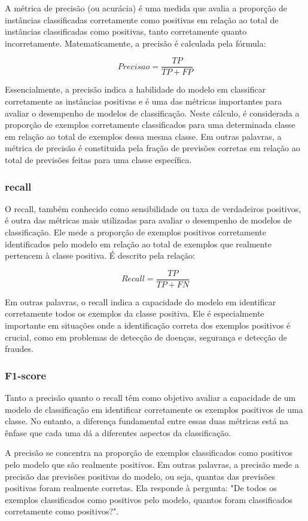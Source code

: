 A métrica de precisão (ou acurácia) é uma medida que avalia a proporção de instâncias classificadas corretamente como positivas em relação ao total de instâncias classificadas como positivas, tanto corretamente quanto incorretamente. Matematicamente, a precisão é calculada pela fórmula:

\[
    Precisao = \frac{TP}{TP+FP}
\]

Essencialmente, a precisão indica a habilidade do modelo em classificar corretamente as instâncias positivas e é uma das métricas importantes para avaliar o desempenho de modelos de classificação. Neste cálculo, é considerada a proporção de exemplos corretamente classificados para uma determinada classe em relação ao total de exemplos dessa mesma classe. Em outras palavras, a métrica de precisão é constituida pela fração de previsões corretas em relação ao total de previsões feitas para uma classe específica.


\subsubsection{recall}

O recall, também conhecido como sensibilidade ou taxa de verdadeiros positivos, é outra das métricas mais utilizadas para avaliar o desempenho de modelos de classificação. Ele mede a proporção de exemplos positivos corretamente identificados pelo modelo em relação ao total de exemplos que realmente pertencem à classe positiva. É descrito pela relação:

\[
    Recall = \frac{TP}{TP+FN}
\]

Em outras palavras, o recall indica a capacidade do modelo em identificar corretamente todos os exemplos da classe positiva. Ele é especialmente importante em situações onde a identificação correta dos exemplos positivos é crucial, como em problemas de detecção de doenças, segurança e detecção de fraudes.

\subsubsection{F1-score}

Tanto a precisão quanto o recall têm como objetivo avaliar a capacidade de um modelo de classificação em identificar corretamente os exemplos positivos de uma classe. No entanto, a diferença fundamental entre essas duas métricas está na ênfase que cada uma dá a diferentes aspectos da classificação.

A precisão se concentra na proporção de exemplos classificados como positivos pelo modelo que são realmente positivos. Em outras palavras, a precisão mede a precisão das previsões positivas do modelo, ou seja, quantas das previsões positivas foram realmente corretas. Ela responde à pergunta: "De todos os exemplos classificados como positivos pelo modelo, quantos foram classificados corretamente como positivos?".

